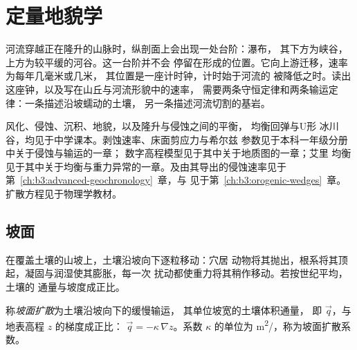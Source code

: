 \chapter{定量地貌学}\label{ch:b3:quantitative-geomorphology}

河流穿越正在隆升的山脉时，纵剖面上会出现一处台阶：瀑布，
其下方为峡谷，上方为较平缓的河谷。这一台阶并不会
停留在形成的位置。它向上游迁移，速率为每年几毫米或几米，
其位置是一座计时钟，计时始于河流的
被降低之时。读出这座钟，以及写在山丘与河流形貌中的速率，
需要两条守恒定律和两条输运定律：一条描述沿坡蠕动的土壤，
另一条描述河流切割的基岩。

\begin{recall}
风化、侵蚀、沉积、地貌，以及隆升与侵蚀之间的平衡，
均衡回弹与U形
冰川谷，均见于中学课本。剥蚀速率、床面剪应力与希尔兹
参数见于本科一年级分册中关于侵蚀与输运的一章；
数字高程模型见于其中关于地质图的一章；艾里
均衡见于其中关于均衡与重力异常的一章。及由其导出的侵蚀速率见于
第~\ref{ch:b3:advanced-geochronology}~章，与
见于第~\ref{ch:b3:orogenic-wedges}~章。
扩散方程见于物理学教材。
\end{recall}

\section{坡面}\label{sec:b3:quantitative-geomorphology:hillslopes}

在覆盖土壤的山坡上，土壤沿坡向下逐粒移动：穴居
动物将其抛出，根系将其顶起，凝固与润湿使其膨胀，每一次
扰动都使重力将其稍作移动。若按世纪平均，土壤的
通量与坡度成正比。

\begin{definition}[坡面扩散]\label{def:b3:quantitative-geomorphology:diffusion}
称\emph{坡面扩散}为土壤沿坡向下的缓慢输运，
其单位坡宽的土壤体积通量，
即 $\vec q$，与地表高程 $z$ 的梯度成正比：
$\vec q = -\kappa\,\nabla z$。系数 $\kappa$ 的单位为
\unit{m^2/}，称为坡面扩散系数。
\end{definition}

